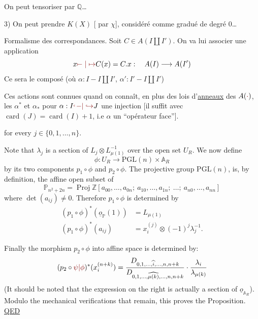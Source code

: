 On peut tensoriser par $\mathbb{Q}$\ldots

3) On peut prendre $K(X)$ [ par $\chi$], considéré comme gradué de degré 0\ldots

Formalisme des correspondances. Soit $C\in A(I\amalg I')$. On va lui associer une application
\[
x\unsure{\mapstochar\relbar|\mapsto} C(x)=C.x:\quad A(I)\longrightarrow A(I')
\]
Ce sera le composé (où $\alpha:I-I\amalg I'$, $\alpha':I'-I\amalg I'$)

Ces actions sont connues quand on connaît, en plus des lois d'\uline{anneaux} des $A(\unsure{\cdot})$, les $\alpha^*$ et $\alpha_*$ pour $\alpha:I\unsure{\lhook\joinrel-|\hookrightarrow}J$ une injection [il suffit avec $\operatorname{card}(J)=\operatorname{card}(I)+1$, i.e $\alpha$ un ``opérateur face''].


for every $j\in\{0,1,\ldots,n\}$.

Note that $\lambda_j$ is a section of $L_j\otimes L_{\mu(1)}^{-1}$ over the open set $U_R$. We now define
\[
\phi:U_R\longrightarrow\mathrm{PGL}(n)\times\mathbb{A}_R
\]
by its two components $p_1\circ\phi$ and $p_2\circ\phi$. The projective group $\mathrm{PGL}(n)$, is, by definition, the affine open subset of
\[
\mathbb{P}_{n^2+2n}=\operatorname{Proj}\mathbb{Z}[a_{00},\ldots,a_{0n};\ a_{10},\ldots,a_{1n};\ \ldots;\ a_{n0},\ldots,a_{nn}]
\]
where $\det(a_{ij})\ne0$. Therefore $p_1\circ\phi$ is determined by
\[
\begin{aligned}
(p_1\circ\phi)^*(\underline{o}_{\mathbb{P}}(1))&=L_{\mu(1)}\\
(p_1\circ\phi)^*(a_{ij})&=x_i^{(j)}\otimes(-1)^j\lambda_j^{-1}.
\end{aligned}
\]

Finally the morphism $p_2\circ\phi$ into affine space is determined by:
\[
(p_2\circ\unsure{\psi|\phi})^*(x_i^{(n+k)})
=\frac{D_{0,1,\ldots,\widehat{i},\ldots,n,n+k}}{D_{0,1,\ldots,\widehat{\mu(k)},\ldots,n,n+k}}
\cdot\frac{\lambda_i}{\lambda_{\mu(k)}}
\]
(It should be noted that the expression on the right is actually a section of $\underline{o}_{\mathbb{A}_R}$). Modulo the mechanical verifications that remain, this proves the Proposition. \uline{QED}

